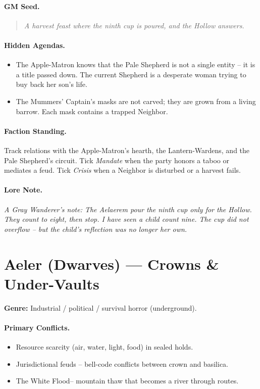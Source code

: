 \paragraph{GM Seed.}
\begin{quote}
\emph{A harvest feast where the ninth cup is poured, and the Hollow answers.}
\end{quote}

\paragraph{Hidden Agendas.}
\begin{itemize}
  \item The Apple-Matron knows that the Pale Shepherd is not a single entity -- it is a title passed down. The current Shepherd is a desperate woman trying to buy back her son's life.
  \item The Mummers' Captain's masks are not carved; they are grown from a living barrow. Each mask contains a trapped Neighbor.
\end{itemize}

\paragraph{Faction Standing.}
Track relations with the Apple-Matron's hearth, the Lantern-Wardens, and the Pale Shepherd's circuit. Tick \textit{Mandate} when the party honors a taboo or mediates a feud. Tick \textit{Crisis} when a Neighbor is disturbed or a harvest fails.

\paragraph{Lore Note.}
\emph{A Gray Wanderer's note: \textquotedbl The Aelaerem pour the ninth cup only for the Hollow. They count to eight, then stop. I have seen a child count nine. The cup did not overflow -- but the child's reflection was no longer her own.\textquotedbl}

\section{Aeler (Dwarves) --- \textquotedbl Crowns \& Under-Vaults\textquotedbl}
\textbf{Genre:} Industrial / political / survival horror (underground).

\paragraph{Primary Conflicts.}
\begin{itemize}
  \item Resource scarcity (air, water, light, food) in sealed holds.
  \item Jurisdictional feuds -- bell-code conflicts between crown and basilica.
  \item The \textquotedbl White Flood\textquotedbl -- mountain thaw that becomes a river through routes.
\end{itemize}

